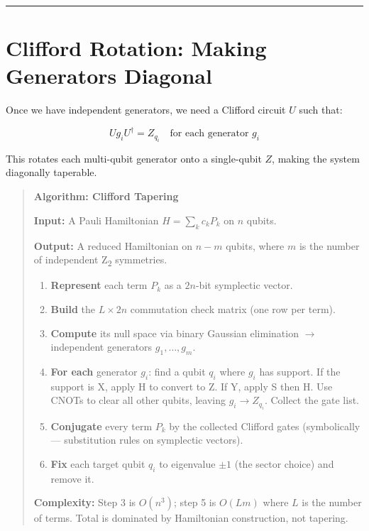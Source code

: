 \documentclass[
  11pt,
  oneside]{book}
\providecommand{\tightlist}{%
  \setlength{\itemsep}{0pt}\setlength{\parskip}{0pt}}
\begin{document}
\begin{center}\rule{0.5\linewidth}{0.5pt}\end{center}

\section{Clifford Rotation: Making Generators
Diagonal}\label{clifford-rotation-making-generators-diagonal}

Once we have independent generators, we need a Clifford circuit \(U\)
such that:

\[U g_i U^\dagger = Z_{q_i} \quad \text{for each generator } g_i\]

This rotates each multi-qubit generator onto a single-qubit \(Z\),
making the system diagonally taperable.

\begin{quote}
\textbf{Algorithm: Clifford Tapering}

\textbf{Input:} A Pauli Hamiltonian \(\hat{H} = \sum_k c_k P_k\) on
\(n\) qubits.

\textbf{Output:} A reduced Hamiltonian on \(n - m\) qubits, where \(m\)
is the number of independent Z\textsubscript{2} symmetries.

\begin{enumerate}
\def\labelenumi{\arabic{enumi}.}
\tightlist
\item
  \textbf{Represent} each term \(P_k\) as a \(2n\)-bit symplectic
  vector.
\item
  \textbf{Build} the \(L \times 2n\) commutation check matrix (one row
  per term).
\item
  \textbf{Compute} its null space via binary Gaussian elimination $\rightarrow$
  independent generators \(g_1, \ldots, g_m\).
\item
  \textbf{For each} generator \(g_i\): find a qubit \(q_i\) where
  \(g_i\) has support. If the support is X, apply H to convert to Z. If
  Y, apply S then H. Use CNOTs to clear all other qubits, leaving
  \(g_i \to Z_{q_i}\). Collect the gate list.
\item
  \textbf{Conjugate} every term \(P_k\) by the collected Clifford gates
  (symbolically --- substitution rules on symplectic vectors).
\item
  \textbf{Fix} each target qubit \(q_i\) to eigenvalue \(\pm 1\) (the
  sector choice) and remove it.
\end{enumerate}

\textbf{Complexity:} Step 3 is \(O(n^3)\); step 5 is \(O(Lm)\) where
\(L\) is the number of terms. Total is dominated by Hamiltonian
construction, not tapering.
\end{quote}
\end{document}
